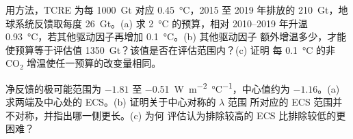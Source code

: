 \begin{exercise}[$\star\star\star$]\label{exo:b2:anthropogenic-climate-change:11}
用方法，TCRE 为每
\qty{1000}{Gt} 对应 \qty{0.45}{\celsius}，2015 至 2019 年排放的 \qty{210}{Gt}，地球系统反馈取每度
\qty{26}{Gt}。(a) 求 \qty{2}{\celsius} 的预算，相对
2010--2019 年升温 \qty{0.93}{\celsius}，若其他驱动因子再增加 \qty{0.1}{\celsius}。(b) 其他驱动因子
额外增温多少，才能使预算等于评估值 \qty{1350}{Gt}？该值是否在评估范围内？(c) 证明
每 \qty{0.1}{\celsius} 的非 CO$_2$ 增温使任一预算的改变量相同。
\end{exercise}

\begin{exercise}[$\star\star\star$]\label{exo:b2:anthropogenic-climate-change:12}
净反馈的极可能范围为 $-1.81$ 至 \qty{-0.51}{W.m^{-2}.\celsius^{-1}}，中心值约为
$-1.16$。(a) 求两端及中心处的 ECS。(b) 证明关于中心对称的 $\lambda$ 范围
所对应的 ECS 范围并不对称，并指出哪一侧更长。(c) 为何
评估认为排除较高的 ECS 比排除较低的更困难？
\end{exercise}

